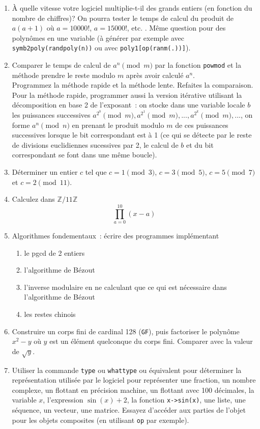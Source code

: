 \documentclass[a4paper,11pt]{article}
\newcommand{\Z}{{\mathbb{Z}}}
\begin{document}
\begin{enumerate}
\item \`A quelle vitesse votre logiciel multiplie-t-il des
grands entiers (en fonction du nombre de chiffres)? 
On pourra tester le temps de calcul du produit
de $a(a+1)$ o\`u $a=10 000!$, $a=15000!$, etc. .
M\^eme question pour des polyn\^omes en une variable (\`a g\'en\'erer
par exemple avec \verb|symb2poly(randpoly(n))| ou avec \verb|poly1[op(ranm(.))]|).

\item Comparer le temps de calcul de $a^n \pmod m$ par la fonction
\verb|powmod| et la m\'ethode prendre le reste modulo $m$ apr\`es avoir 
calcul\'e $a^n$.\\
Programmez la m\'ethode rapide et la m\'ethode lente. Refaites la
comparaison. Pour la m\'ethode rapide, programmer aussi la version
it\'erative utilisant la d\'ecomposition en base 2 de l'exposant~:
on stocke dans une variable locale $b$ les puissances successives
$a^{2^0} \pmod m,a^{2^1} \pmod m, ..., a^{2^k} \pmod m, ...$,
on forme $a^n \pmod n$ en prenant le produit modulo $m$ de ces puissances
successives lorsque le bit correspondant est \`a 1 (ce qui se
d\'etecte par le reste de divisions euclidiennes sucessives par 2, le
calcul de $b$ et du bit correspondant se font dans une m\^eme boucle).

\item D\'eterminer un entier $c$ tel que $c=1 \pmod 3$, 
$c=3 \pmod 5$, $c=5 \pmod 7$ et $c=2 \pmod{11}$.

\item Calculez dans $\Z/11\Z$
\[  \prod_{a=0}^{10} (x-a)\]

\item Algorithmes fondementaux~: \'ecrire des programmes impl\'ementant
\begin{enumerate}
\item le pgcd de 2 entiers
\item l'algorithme de B\'ezout
\item l'inverse modulaire en ne calculant que ce qui est n\'ecessaire
dans l'algorithme de B\'ezout
\item les restes chinois
\end{enumerate}

\item Construire un corps fini de cardinal 128 (\verb|GF|), puis factoriser
le polyn\^ome $x^2-y$ o\`u $y$ est un \'el\'ement quelconque du corps
fini.
Comparer avec la valeur de $\sqrt{y}$.

\item Utiliser la commande {\tt type} ou {\tt whattype} ou \'equivalent
pour d\'eterminer la repr\'esentation
utilis\'ee par le logiciel pour repr\'esenter
une fraction, un nombre complexe, un flottant en pr\'ecision machine, 
un flottant avec 100 d\'ecimales, la variable $x$, l'expression $\sin(x)+2$,
la fonction {\tt x->sin(x)}, une liste, une s\'equence, un vecteur,
une matrice. Essayez d'acc\'eder aux parties de
l'objet pour les objets composites (en utilisant {\tt op} par exemple).


\end{enumerate}
\end{document}
